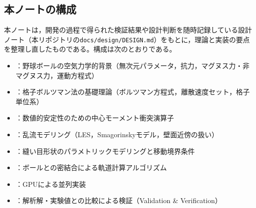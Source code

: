 \subsection{本ノートの構成}

本ノートは，開発の過程で得られた検証結果や設計判断を随時記録している設計ノート（本リポジトリの\texttt{docs/design/DESIGN.md}）をもとに，理論と実装の要点を整理し直したものである。構成は次のとおりである。

\begin{itemize}
	\item {}：野球ボールの空気力学的背景（無次元パラメータ，抗力，マグヌス力・非マグヌス力，運動方程式）
	\item {}：格子ボルツマン法の基礎理論（ボルツマン方程式，離散速度セット，格子単位系）
	\item {}：数値的安定性のための中心モーメント衝突演算子
	\item {}：乱流モデリング（LES，Smagorinskyモデル，壁面近傍の扱い）
	\item {}：縫い目形状のパラメトリックモデリングと移動境界条件
	\item {}：ボールとの密結合による軌道計算アルゴリズム
	\item {}：GPUによる並列実装
	\item {}：解析解・実験値との比較による検証（Validation \& Verification）
\end{itemize}
